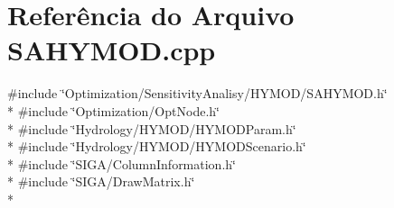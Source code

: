 \section{Referência do Arquivo S\+A\+H\+Y\+M\+O\+D.\+cpp}
\label{_s_a_h_y_m_o_d_8cpp}
{\ttfamily \#include \char`\"{}Optimization/\+Sensitivity\+Analisy/\+H\+Y\+M\+O\+D/\+S\+A\+H\+Y\+M\+O\+D.\+h\char`\"{}}\\*
{\ttfamily \#include \char`\"{}Optimization/\+Opt\+Node.\+h\char`\"{}}\\*
{\ttfamily \#include \char`\"{}Hydrology/\+H\+Y\+M\+O\+D/\+H\+Y\+M\+O\+D\+Param.\+h\char`\"{}}\\*
{\ttfamily \#include \char`\"{}Hydrology/\+H\+Y\+M\+O\+D/\+H\+Y\+M\+O\+D\+Scenario.\+h\char`\"{}}\\*
{\ttfamily \#include \char`\"{}S\+I\+G\+A/\+Column\+Information.\+h\char`\"{}}\\*
{\ttfamily \#include \char`\"{}S\+I\+G\+A/\+Draw\+Matrix.\+h\char`\"{}}\\*
